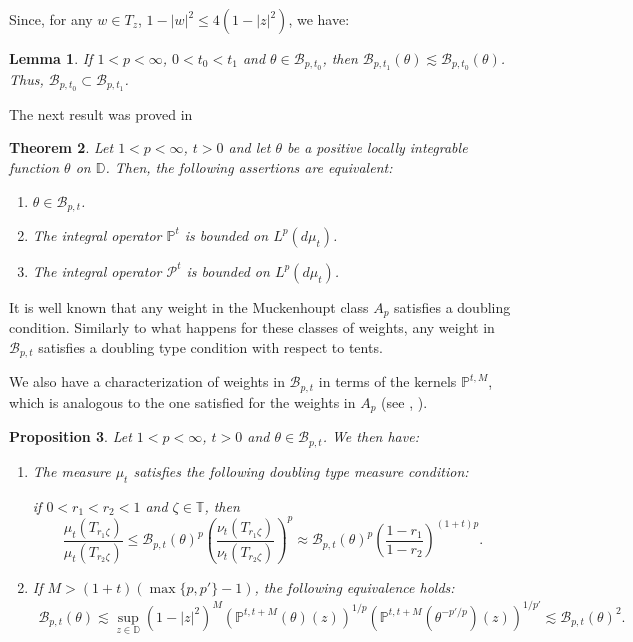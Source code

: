 \documentclass[12pt,twoside,leqno,final]{amsart}
\theoremstyle{plain}
\newtheorem{thm}{Theorem}[section]
\newtheorem{lem}[thm]{Lemma}
\newtheorem{prop}[thm]{Proposition}
\begin{document}
Since, for any $w\in T_z$,  $1-|w|^2\le 4(1-|z|^2)$, we have:

\begin{lem} \label{lem:embedBpt}
If $1<p<\infty$, $0<t_0<t_1$ and $\theta\in {{\mathcal B}}_{p,t_0}$, then 
${{\mathcal B}}_{p,t_1}(\theta)\lesssim {{\mathcal B}}_{p,t_0}(\theta)$.  
Thus, ${{\mathcal B}}_{p,t_0}\subset {{\mathcal B}}_{p,t_1}$. 
\end{lem}

The next result was proved in  \cite[Theorem 1 and Propositions 3, 5]{Be}
\begin{thm} \label{thm:opBt}
Let $1<p<\infty$, $t>0$ and let $\theta$ be a positive locally integrable function $\theta$ on ${{\mathbb D}}$. Then, the following assertions are equivalent:
\begin{enumerate}
	\item \label{item:opBt1}$\theta\in {{\mathcal B}}_{p,t}$. 
	\item \label{item:opBt2}The integral operator ${\mathbb{P}}^{t}$ is bounded on $L^p(d\mu_t)$.
	\item \label{item:opBt3} The integral operator ${{\mathcal P}}^{t}$ is bounded on $L^p(d\mu_t)$.	
\end{enumerate}
\end{thm}

It is well known that any weight in the Muckenhoupt class $A_{p}$ satisfies a doubling condition. 
Similarly to what happens for these classes of weights, any weight in ${{\mathcal B}}_{p,t}$ satisfies a doubling type condition 
with respect to tents. 

We also have a characterization of weights in ${{\mathcal B}}_{p,t}$ in terms of the kernels ${\mathbb{P}}^{t,M}$, 
which is analogous to the one satisfied for the weights in $A_p$ (see \cite{Pe-W}, \cite{Ca-Fa-Or}).

\begin{prop}\label{prop:BP}
Let $1<p<\infty$, $t>0$ and  $\theta\in {{\mathcal B}}_{p,t}$. We then have:

\begin{enumerate}
\item \label{item:BP1} The measure $\mu_t$ satisfies the following doubling type measure condition:

if $0<r_1<r_2<1$ and ${\zeta}\in{{\mathbb T}}$, then 
$$
\frac{\mu_t(T_{r_1{\zeta}})}{\mu_t(T_{r_2{\zeta}})}\le
 {{\mathcal B}}_{p,t}(\theta)^p\left(\frac{\nu_t(T_{r_1{\zeta}})}{\nu_t(T_{r_2{\zeta}})}\right)^p
  \approx {{\mathcal B}}_{p,t}(\theta)^p\left(\frac{1-r_1}{1-r_2}\right)^{(1+t)p} .
$$

\item \label{item:BP2} 
If   $M>(1+t)(\max\{p,p'\}-1)$, the following equivalence holds:
\begin{align*}
{{\mathcal B}}_{p,t}(\theta)\lesssim \sup_{z\in{{\mathbb D}}}(1-|z|^2)^M \left({\mathbb{P}}^{t,t+M}(\theta)(z)\right)^{1/p} \left({\mathbb{P}}^{t,t+M}(\theta^{-p'/p})(z)\right)^{1/p'}
\lesssim {{\mathcal B}}_{p,t}(\theta)^2.
\end{align*}
\end{enumerate}
\end{prop}
\end{document}
